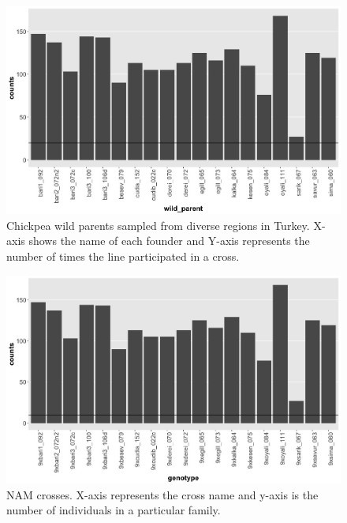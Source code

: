 \begin{figure}
    \centering
    \includegraphics[scale = 0.4]{tex/chickpea/wild_parent.jpeg}
    \caption{Chickpea wild parents sampled from diverse regions in Turkey. X-axis shows the name of each founder and Y-axis represents the number of times the line participated in a cross.}
    \label{fig:wild-parent}
\end{figure}

\begin{figure}
    \centering
    \includegraphics[scale=0.4]{tex/chickpea/crosses.jpeg}
    \caption{NAM crosses. X-axis represents the cross name and y-axis is the number of individuals in a particular family.}
    \label{fig:crosses}
\end{figure}

